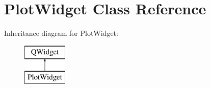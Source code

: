 \hypertarget{class_plot_widget}{}\section{Plot\+Widget Class Reference}
\label{class_plot_widget}
Inheritance diagram for Plot\+Widget\+:\begin{figure}[H]
\begin{center}
\leavevmode
\includegraphics[height=2.000000cm]{class_plot_widget}
\end{center}
\end{figure}
